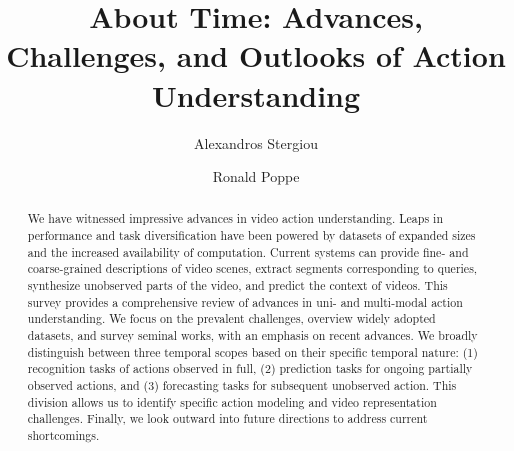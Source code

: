 \documentclass[smallextended,twocolumn,natbib]{svjour3}
\begin{document}
\sloppy

\title{About Time: Advances, Challenges, and Outlooks of Action Understanding}




\author{Alexandros Stergiou \and Ronald Poppe}


\maketitle

\begin{abstract}
We have witnessed impressive advances in video action understanding. Leaps in performance and task diversification have been powered by datasets of expanded sizes and the increased availability of computation. Current systems can provide fine- and coarse-grained descriptions of video scenes, extract segments corresponding to queries, synthesize unobserved parts of the video, and predict the context of videos. This survey provides a comprehensive review of advances in uni- and multi-modal action understanding. We focus on the prevalent challenges, overview widely adopted datasets, and survey seminal works, with an emphasis on recent advances. We broadly distinguish between three temporal scopes based on their specific temporal nature: (1) recognition tasks of actions observed in full, (2) prediction tasks for ongoing partially observed actions, and (3) forecasting tasks for subsequent unobserved action. This division allows us to identify specific action modeling and video representation challenges. Finally, we look outward into future directions to address current shortcomings.

\end{abstract}
\end{document}
